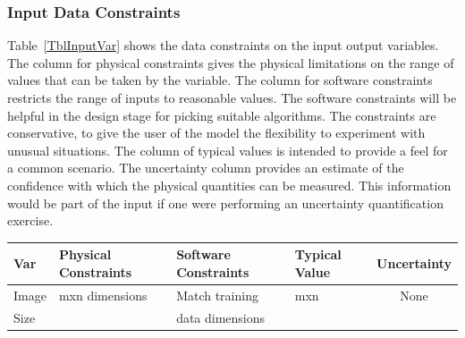 \documentclass[12pt]{article}
\begin{document}



\subsubsection{Input Data Constraints} \label{sec_DataConstraints}    

Table~\ref{TblInputVar} shows the data constraints on the input output
variables.  The column for physical constraints gives the physical limitations
on the range of values that can be taken by the variable.  The column for
software constraints restricts the range of inputs to reasonable values.  The
software constraints will be helpful in the design stage for picking suitable
algorithms.  The constraints are conservative, to give the user of the model the
flexibility to experiment with unusual situations.  The column of typical values
is intended to provide a feel for a common scenario.  The uncertainty column
provides an estimate of the confidence with which the physical quantities can be
measured.  This information would be part of the input if one were performing an
uncertainty quantification exercise.


\begin{table}[!h]
  \caption{Input Variables} \label{TblInputVar}
  \renewcommand{\arraystretch}{1.2}
\noindent \begin{longtable*}{l l l l c} 
  \toprule
  \textbf{Var} & \textbf{Physical Constraints} & \textbf{Software Constraints} &
                             \textbf{Typical Value} & \textbf{Uncertainty}\\
  \midrule 
  Image & mxn dimensions & Match training & mxn & None\\
  Size & & data dimensions &
  \\
  \bottomrule
\end{longtable*}
\end{table}
\end{document}

